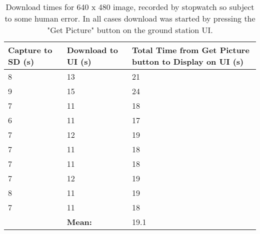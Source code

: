 \begin{table}[!hbtp]

	\centering
	\begin{tabular}{ | p{3cm} | p{3cm} | p{4cm} | }
	\hline
	\textbf{Capture to SD (s)} & \textbf{Download to UI (s)} & 
	\textbf{Total Time from Get Picture button to Display on UI (s)} \\ \hline

	8 & 13  & 21 \\ \hline
	9 & 15  & 24 \\ \hline
	7 & 11  & 18 \\ \hline
	6 & 11  & 17 \\ \hline
	7 & 12  & 19 \\ \hline
	7 & 11  & 18 \\ \hline
	7 & 11  & 18 \\ \hline
	7 & 12  & 19 \\ \hline
	8 & 11  & 19 \\ \hline
	7 & 11  & 18 \\ \hline
	 & \textbf{Mean:} & 19.1 \\ \hline

	\end{tabular}
	\caption{Download times for 640 x 480 image, recorded by stopwatch so subject to some human error. In all cases download was started by pressing the "Get Picture" button on the ground station UI.}
	\label{table:download_time_test}
\end{table}



